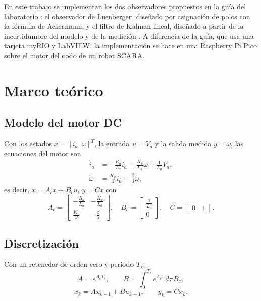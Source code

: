 \documentclass[conference,a4paper]{IEEEtran}
\begin{document}
En este trabajo se implementan los dos observadores propuestos en la guía del laboratorio \cite{guia,guiaeia}: el observador de Luenberger, diseñado por asignación de polos con la fórmula de Ackermann, y el filtro de Kalman lineal, diseñado a partir de la incertidumbre del modelo y de la medición \cite{welch}. A diferencia de la guía, que usa una tarjeta myRIO y LabVIEW, la implementación se hace en una Raspberry Pi Pico sobre el motor del codo de un robot SCARA.

\section{Marco teórico}
\subsection{Modelo del motor DC}
Con los estados $x=[i_a\;\;\omega]^T$, la entrada $u=V_a$ y la salida medida $y=\omega$, las ecuaciones del motor son
\begin{align}
\dot{i}_a &= -\frac{R_a}{L_a} i_a - \frac{K_v}{L_a}\omega + \frac{1}{L_a}V_a,\\
\dot{\omega} &= \frac{K_v}{J} i_a - \frac{\beta}{J}\omega,
\end{align}
es decir, $\dot{x}=A_c x + B_c u$, $y = Cx$ con
\begin{equation}
A_c=\begin{bmatrix}-\frac{R_a}{L_a} & -\frac{K_v}{L_a}\\[2pt] \frac{K_v}{J} & -\frac{\beta}{J}\end{bmatrix},\quad
B_c=\begin{bmatrix}\frac{1}{L_a}\\[2pt] 0\end{bmatrix},\quad
C=\begin{bmatrix}0 & 1\end{bmatrix}.
\end{equation}

\subsection{Discretización}
Con un retenedor de orden cero y periodo $T_s$:
\begin{equation}
A = e^{A_c T_s},\qquad B=\int_0^{T_s} e^{A_c\tau}\,d\tau\, B_c,
\end{equation}
\begin{equation}
x_k = A x_{k-1} + B u_{k-1},\qquad y_k = C x_k .
\end{equation}
\end{document}
